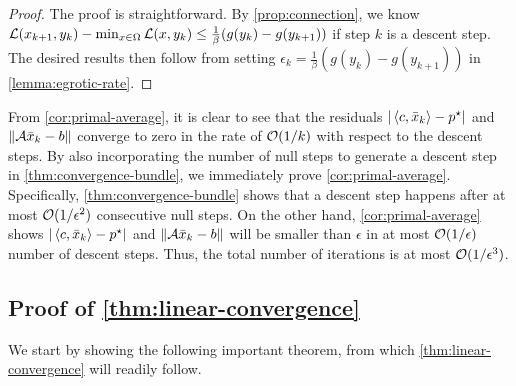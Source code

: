 \documentclass[11pt]{article}
\begin{document}
\begin{proof}
The proof is straightforward. By \cref{prop:connection}, we know $\mathcal{L}(x_{k+1},y_k) - \min_{x\in \Omega} \mathcal{L}(x,y_k) \leq   \frac{1}{\beta} (g(y_k) - g(y_{k+1}))$ if step $k$ is a descent step. The desired results then follow from setting $\epsilon_k  =  \frac{1}{\beta} (g(y_k) - g(y_{k+1}))$ in \cref{lemma:egrotic-rate}.
\end{proof}

From \cref{cor:primal-average}, it is clear to see that the residuals  $|\left \langle c, \Bar{x}_k \right\rangle - p^\star |$ and $\|\mathcal{A}  \Bar{x}_k - b\|$ converge to zero in the rate of $\mathcal{O}(1/k)$ with respect to the descent steps. By also incorporating the number of null steps to generate a descent step in \cref{thm:convergence-bundle}, we immediately prove \cref{cor:primal-average}. Specifically, \cref{thm:convergence-bundle} shows that a descent step happens after at most $\mathcal{O}(1/\epsilon^{2})$ consecutive null steps. On the other hand, \cref{cor:primal-average} shows $|\left \langle c, \Bar{x}_k \right\rangle - p^\star |$ and $\|\mathcal{A} \Bar{x}_k - b \|$ will be smaller than $\epsilon$ in at most $\mathcal{O}(1/\epsilon)$ number of descent steps. Thus, the total number of iterations is at most $\mathcal{O}(1/\epsilon^{3})$. 

\subsection{Proof of \cref{thm:linear-convergence}}
\label{apx:thm:linear-convergence}
We start by showing the following important theorem, from which \cref{thm:linear-convergence} will readily follow.
\end{document}
